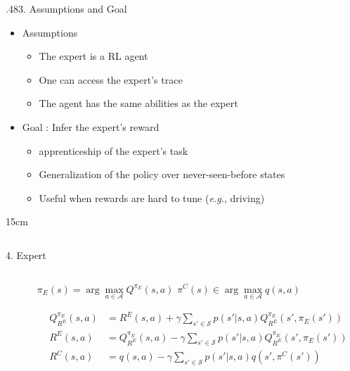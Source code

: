 \documentclass[xcolor=x11names,12pt]{beamer}
\newcommand{\classifpolicy}{\pi^C}
\newcommand{\classifscorefunc}{q}
\newcommand{\Rc}{R^C}
\newcommand{\statespace}{\mathcal{S}}
\newcommand{\discount}{\gamma}
\newcommand{\actionBis}{a}
\newcommand{\state}{s}
\newcommand{\expertpolicy}{\pi_E}
\newcommand{\expertreward}{R^E}
\newcommand{\transprobfunceval}[3]{p\left(\left.#3\right|#1,#2\right)}
\newcommand{\quality}[2]{Q^{#1}_{#2}}
\begin{document}
\begin{frame}
{\begin{columns}
\begin{column}{.48\textwidth}
    \end{column}
  \end{columns}
}
{.48}{3. Assumptions and Goal}{
  \begin{itemize}
  \item Assumptions
    \begin{itemize}
    \item The expert is a RL agent
    \item One can access the expert's trace
    \item The agent has the same abilities as the expert
    \end{itemize}
  \item Goal : Infer the expert's reward
    \begin{itemize}
    \item apprenticeship of the expert's task
    \item Generalization of the policy over never-seen-before states
    \item Useful when rewards are hard to tune ({\it e.g.}, driving)
    \end{itemize}
  \end{itemize}
}
{15cm}
\vfill
\begin{columns}
  \begin{column}{.48\textwidth}
    \begin{block}{4. Expert}
      \begin{columns}
        \begin{column}{0.001\textwidth}
          \vspace{8cm}
        \end{column}
        \begin{column}{\textwidth}
      $\pi_E(s) = \arg\max\limits_{a\in\mathcal{A}} Q^{\pi_E}(s,a)$ \hspace{12em} $\pi^C(s) \in \arg\max\limits_{a\in\mathcal{A}}q(s,a)$
          

\begin{align*}
\quality{\expertpolicy}{\expertreward}(\state,\actionBis) &= \expertreward(\state,\actionBis) + \discount \sum_{\state'\in \statespace}\transprobfunceval{\state}{\actionBis}{\state'} \quality{\expertpolicy}{\expertreward}(\state',\expertpolicy(\state'))\\
\expertreward(\state,\actionBis) &= \quality{\expertpolicy}{\expertreward}(\state,\actionBis) - \discount \sum_{\state'\in \statespace}\transprobfunceval{\state}{\actionBis}{\state'} \quality{\expertpolicy}{\expertreward}(\state',\expertpolicy(\state'))\\
\Rc(\state,\actionBis) &= \classifscorefunc(\state,\actionBis) - \discount \sum_{\state'\in \statespace}\transprobfunceval{\state}{\actionBis}{\state'} \classifscorefunc(\state',\classifpolicy(\state'))
\end{align*}


\end{column}
\end{columns}
\end{block}
\end{column}
\end{columns}
\end{frame}
\end{document}
